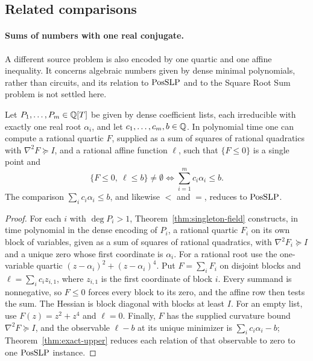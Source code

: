 \subsection{Related comparisons}
\label{sec:reductions-comparisons}

\paragraph{Sums of numbers with one real conjugate.}
A different source problem is also encoded by one quartic and one affine
inequality. It concerns algebraic numbers given by dense minimal polynomials,
rather than circuits, and its relation to $\mathrm{PosSLP}$ and to the Square Root Sum
problem is not settled here.

\begin{proposition}
\label{prop:reductions-sums}
Let $P_1,\ldots,P_m\in\mathbb Q[T]$ be given by dense coefficient lists, each
irreducible with exactly one real root $\alpha_i$, and let
$c_1,\ldots,c_m,b\in\mathbb Q$. In polynomial time one can compute a rational quartic
$F$, supplied as a sum of squares of rational quadratics with
$\nabla^2F\succeq I$, and a rational affine function $\ell$, such that
$\{F\le0\}$ is a single point and
\[
 \{F\le0,\ \ell\le b\}\ne\emptyset\iff\sum_{i=1}^mc_i\alpha_i\le b.
\]
The comparison $\sum_ic_i\alpha_i\le b$, and likewise $<$ and $=$, reduces to
$\mathrm{PosSLP}$.
\end{proposition}

\begin{proof}
For each $i$ with $\deg P_i>1$, Theorem~\ref{thm:singleton-field} constructs,
in time polynomial in the dense encoding of $P_i$, a rational quartic $F_i$ on
its own block of variables, given as a sum of squares of rational quadratics,
with $\nabla^2F_i\succeq I$ and a unique zero whose first coordinate is
$\alpha_i$. For a rational root use the one-variable quartic
$(z-\alpha_i)^2+(z-\alpha_i)^4$. Put $F=\sum_iF_i$ on disjoint blocks and
$\ell=\sum_ic_iz_{i,1}$, where $z_{i,1}$ is the first coordinate of block $i$.
Every summand is nonnegative, so $F\le0$ forces every block to its zero, and
the affine row then tests the sum. The Hessian is block diagonal with blocks at
least $I$. For an empty list, use $F(z)=z^2+z^4$ and $\ell=0$. Finally, $F$ has
the supplied curvature bound $\nabla^2F\succeq I$, and the observable $\ell-b$
at its unique minimizer is $\sum_ic_i\alpha_i-b$; Theorem~\ref{thm:exact-upper}
reduces each relation of that observable to zero to one $\mathrm{PosSLP}$
instance.
\end{proof}

